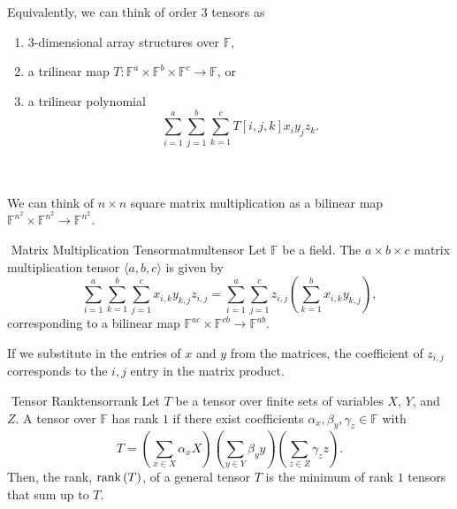         \begin{remark*}
            Equivalently, we can think of order \(3\) tensors as
            \begin{enumerate}
                \item \(3\)-dimensional array structures over \(\mathbb{F}\),
                \item a trilinear map \(T:\mathbb{F}^a\times\mathbb{F}^b\times \mathbb{F}^c\to\mathbb{F}\), or 
                \item a trilinear polynomial 
                \begin{equation*}
                    \sum_{i=1}^a \sum_{j=1}^b \sum_{k=1}^c T[i,j,k]x_iy_jz_k.
                \end{equation*}
            \end{enumerate}
        \end{remark*}
        \vphantom
        \\
        \\
        We can think of \(n\times n\) square matrix multiplication as a bilinear map \(\mathbb{F}^{n^2}\times\mathbb{F}^{n^2}\to\mathbb{F}^{n^2}\).
        \begin{definition}{\Stop\,\,Matrix Multiplication Tensor}{matmultensor}
        Let \(\mathbb{F}\) be a field. The \(a\times b\times c\) matrix multiplication tensor \(\langle a,b,c\rangle\) is given by
        \begin{equation*}
            \sum_{i=1}^a \sum_{k=1}^b \sum_{j=1}^c x_{i,k}y_{k,j}z_{i,j}=\sum_{i=1}^a \sum_{j=1}^c z_{i,j}\left(\sum_{k=1}^b x_{i,k}y_{k,j}\right),
        \end{equation*}
        corresponding to a bilinear map \(\mathbb{F}^{ac}\times \mathbb{F}^{cb}\to \mathbb{F}^{ab}\).
        \end{definition}
        \begin{remark*}
            If we substitute in the entries of \(x\) and \(y\) from the matrices, the coefficient of \(z_{i,j}\) corresponds to the \(i,j\) entry in the matrix product.
        \end{remark*}
        \begin{definition}{\Stop\,\,Tensor Rank}{tensorrank}
            Let \(T\) be a tensor over finite sets of variables \(X\), \(Y\), and \(Z\). A tensor over \(\mathbb{F}\) has rank \(1\) if there exist coefficients \(\alpha_x,\beta_y,\gamma_z\in\mathbb{F}\) with
            \begin{equation*}
                T=\left(\sum_{x\in X}\alpha_x X\right)\left(\sum_{y\in Y}\beta_y y\right)\left(\sum_{z\in Z}\gamma_z z\right).
            \end{equation*}
            Then, the rank, \(\text{rank\,}(T)\), of a general tensor \(T\) is the minimum of rank \(1\) tensors that sum up to \(T\).
        \end{definition}
